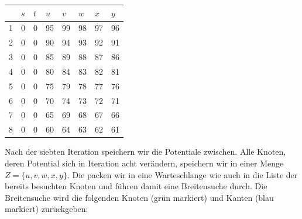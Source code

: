 \documentclass{scrartcl} %
\begin{document}
\begin{aufgabe}
\begin{enumerate}[label=(\alph*)]
            \newcommand{\colwdth}{6ex}
            \begin{center}
                \renewcommand{\arraystretch}{1.5}
                \begin{tabular}{|m{1cm}|m{\colwdth}<{\centering}|m{\colwdth}<{\centering}|m{\colwdth}<{\centering}|m{\colwdth}<{\centering}|m{\colwdth}<{\centering}|m{\colwdth}<{\centering}|m{\colwdth}<{\centering}|}
                \hline\rowcolor{teal!60}
                    & $s$ & $t$ & $u$ & $v$ & $w$ & $x$ & $y$\\\hline
                    1 & 0 & 0 & 95 & 99 & 98 & 97 & 96\\
                    2 & 0 & 0 & 90 & 94 & 93 & 92 & 91\\
                    3 & 0 & 0 & 85 & 89 & 88 & 87 & 86\\
                    4 & 0 & 0 & 80 & 84 & 83 & 82 & 81\\
                    5 & 0 & 0 & 75 & 79 & 78 & 77 & 76\\
                    6 & 0 & 0 & 70 & 74 & 73 & 72 & 71\\
                    7 & 0 & 0 & 65 & 69 & 68 & 67 & 66\\\hline
                    8 & 0 & 0 & 60 & 64 & 63 & 62 & 61\\\hline
                \end{tabular}
            \end{center}
            Nach der siebten Iteration speichern wir die Potentiale zwischen. Alle Knoten, deren Potential sich in Iteration acht verändern, speichern wir in einer Menge $Z = \{u, v, w, x, y\}$. Die packen wir in eine Warteschlange wie auch in die Liste der bereits besuchten Knoten und führen damit eine Breitensuche durch. Die Breitensuche wird die folgenden Knoten (grün markiert) und Kanten (blau markiert) zurückgeben:
            \begin{center}
\end{center}
\end{enumerate}
\end{aufgabe}
\end{document}
